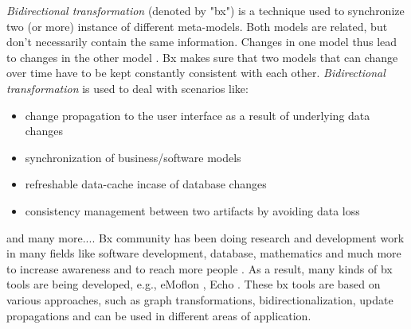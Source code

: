 \textit{Bidirectional transformation} (denoted by "bx") is a technique used to synchronize two (or more) instance of different meta-models. Both models are related, but don't necessarily contain the same information. Changes in one model thus lead to changes in the other model \cite{bx-grace}. Bx makes sure that two models that can change over time have to be kept constantly consistent with each other.
\newline\newline\textit{Bidirectional transformation} is used to deal with scenarios like:
\begin{itemize}
	\item {change propagation to the user interface as a result of underlying data changes}	
	\item {synchronization of business/software models}
	\item {refreshable data-cache incase of database changes}
	\item {consistency management between two artifacts by avoiding data loss}
\end{itemize}
    and many more....
\newline\newline Bx community has been doing research and development work in many fields like software development, database, mathematics and much more to increase awareness and to reach more people \cite{bx-dagstuhl}\cite{bx-grace}. As a result, many kinds of bx tools are being developed, e.g., eMoflon \cite{emoflon-part4}, Echo \cite{echo}. These bx tools are based on various approaches, such as graph transformations, bidirectionalization, update propagations \cite{bx-community} and can be used in different areas of application.

